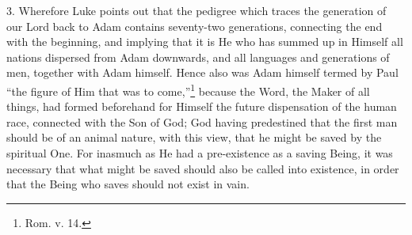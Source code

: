 3. Wherefore Luke points out that the pedigree which traces the generation of our Lord back to Adam contains seventy-two generations, connecting the end with the beginning, and implying that it is He who has summed up in Himself all nations dispersed from Adam downwards, and all languages and generations of men, together with Adam himself. Hence also was Adam himself termed by Paul “the figure of Him that was to come,”\footnote{Rom. v. 14.} because the Word, the Maker of all things, had formed beforehand for Himself the future dispensation of the human race, connected with the Son of God; God having predestined that the first man should be of an animal nature, with this view, that he might be saved by the spiritual One. For inasmuch as He had a pre-existence as a saving Being, it was necessary that what might be saved should also be called into existence, in order that the Being who saves should not exist in vain.

